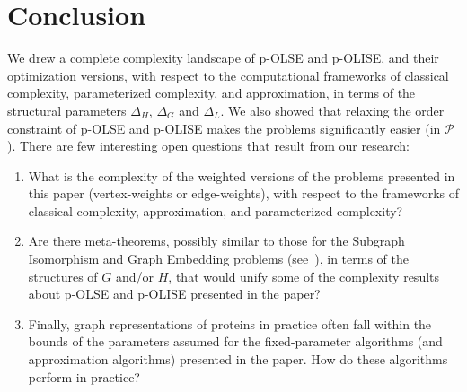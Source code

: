 \documentclass[11pt]{article}
\newcommand{\Pol}{\mbox{$\mathcal P$}}
\begin{document}
\section{Conclusion}\label{sec:conclusion}
We drew a complete complexity landscape of p-OLSE and p-OLISE, and their optimization versions, with respect to the computational frameworks of classical complexity, parameterized complexity, and approximation, in terms of the structural parameters $\Delta_H$, $\Delta_G$ and $\Delta_L$.  We also showed that relaxing the order constraint of p-OLSE and p-OLISE makes the problems significantly easier (in $\Pol$).
There are few interesting open questions that result from our research:


\begin{enumerate}
  \item  What is the complexity of the weighted versions of the problems presented in this paper (vertex-weights or edge-weights), with respect to the frameworks of classical complexity, approximation, and parameterized complexity?
   \item Are there meta-theorems, possibly similar to those for the {\sc Subgraph Isomorphism} and {\sc Graph Embedding} problems (see~\cite{grohebook}), in terms of the structures of $G$ and/or $H$, that would unify some of the complexity results about p-OLSE and p-OLISE presented in the paper?

   \item Finally, graph representations of proteins in practice often fall within the bounds of the parameters assumed for the fixed-parameter algorithms (and approximation algorithms) presented in the paper. How do these algorithms perform in practice?

  \end{enumerate}



\end{document}
